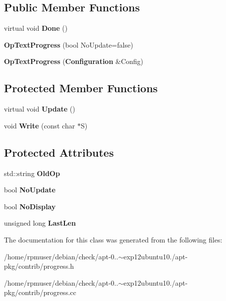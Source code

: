 \subsection*{\-Public \-Member \-Functions}
\begin{DoxyCompactItemize}
\item 
virtual void {\bfseries \-Done} ()\label{classOpTextProgress_a44cace8d4257cdedded8faa819aa0fcb}

\item 
{\bfseries \-Op\-Text\-Progress} (bool \-No\-Update=false)\label{classOpTextProgress_a79c0c10d9e6e4ecf431db6c8beae7a46}

\item 
{\bfseries \-Op\-Text\-Progress} ({\bf \-Configuration} \&\-Config)\label{classOpTextProgress_a97f4896b1b2bdc8b64b1a9f192ff20c9}

\end{DoxyCompactItemize}
\subsection*{\-Protected \-Member \-Functions}
\begin{DoxyCompactItemize}
\item 
virtual void {\bfseries \-Update} ()\label{classOpTextProgress_aec0783b5a136e042adcc47bae4fe5291}

\item 
void {\bfseries \-Write} (const char $\ast$\-S)\label{classOpTextProgress_a6f2161ad493d6f0e27a9ab22281e0e84}

\end{DoxyCompactItemize}
\subsection*{\-Protected \-Attributes}
\begin{DoxyCompactItemize}
\item 
std\-::string {\bfseries \-Old\-Op}\label{classOpTextProgress_a7111653b0fa5a57f10864fa0908cccf3}

\item 
bool {\bfseries \-No\-Update}\label{classOpTextProgress_a5d41b6202f7970e1a5a82fa4b471230d}

\item 
bool {\bfseries \-No\-Display}\label{classOpTextProgress_a79831aaac2cf10c2e9141f8a01a6d88a}

\item 
unsigned long {\bfseries \-Last\-Len}\label{classOpTextProgress_abf86a8712d3d8c8bcdfbc725fdf5ede9}

\end{DoxyCompactItemize}


\-The documentation for this class was generated from the following files\-:\begin{DoxyCompactItemize}
\item 
/home/rpmuser/debian/check/apt-\/0..$\sim$exp12ubuntu10./apt-\/pkg/contrib/progress.\-h\item 
/home/rpmuser/debian/check/apt-\/0..$\sim$exp12ubuntu10./apt-\/pkg/contrib/progress.\-cc\end{DoxyCompactItemize}
